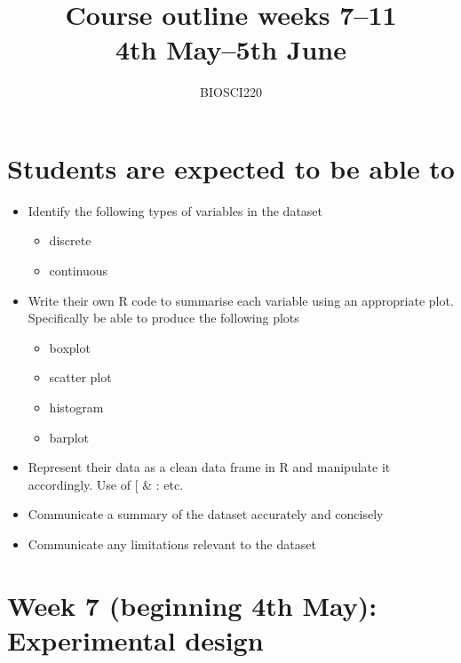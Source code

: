 \documentclass{article}
\begin{document}
\title{Course outline weeks 7--11\\ 4th May--5th June}
\author{BIOSCI220}
\date{}
\maketitle


\section*{Students are expected to be able to}
\begin{itemize}
\item Identify the following types of variables in the dataset
  \begin{itemize}
  \item discrete
  \item continuous
  \end{itemize}
\item Write their own R code to summarise each variable using an appropriate plot. Specifically be able to produce the following plots
  \begin{itemize}
  \item boxplot
  \item scatter plot
  \item histogram
  \item barplot
  \end{itemize}
\item Represent their data as a clean data frame in R and manipulate it accordingly. Use of [ \& : etc.
\item Communicate a summary of the dataset accurately and concisely
\item Communicate any limitations relevant to the dataset
\end{itemize}



\newpage


\section*{Week 7 (beginning 4th May):  Experimental design}
\end{document}

